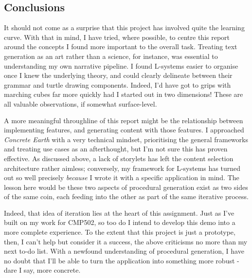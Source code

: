 \documentclass[a4paper, 11pt]{article}
\begin{document}
\begin{flushleft}
\section{Conclusions}

\vspace{5pt}\noindent
It should not come as a surprise that this project has involved quite the learning curve. With that in mind, I have tried, where possible, to centre this report around the concepts I found more important to the overall task. Treating text generation as an art rather than a science, for instance, was essential to understanding my own narrative pipeline. I found L-systems easier to organise once I knew the underlying theory, and could clearly delineate between their grammar and turtle drawing components. Indeed, I'd have got to grips with marching cubes far more quickly had I started out in two dimensions! These are all valuable observations, if somewhat surface-level.

\vspace{5pt}\noindent
A more meaningful throughline of this report might be the relationship between implementing features, and generating content with those features. I approached \textit{Concrete Earth} with a very technical mindset, prioritising the general frameworks and treating use cases as an afterthought, but I'm not sure this has proven effective. As discussed above, a lack of storylets has left the content selection architecture rather aimless; conversely, my framework for L-systems has turned out so well precisely \textit{because} I wrote it with a specific application in mind. The lesson here would be these two aspects of procedural generation exist as two sides of the same coin, each feeding into the other as part of the same iterative process.

\vspace{5pt}\noindent
Indeed, that idea of iteration lies at the heart of this assignment. Just as I've built on my work for CMP502, so too do I intend to develop this demo into a more complete experience. To the extent that this project is just a prototype, then, I can't help but consider it a success, the above criticisms no more than my next to-do list. With a newfound understanding of procedural generation, I have no doubt that I'll be able to turn the application into something more robust - dare I say, more concrete.



\newpage


\end{flushleft}
\end{document}
